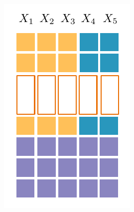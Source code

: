 \documentclass[final]{beamer}
\begin{document}
\begin{frame}{}
\begin{textblock}{25.7}
\begin{minipage}[t]{5.724cm}
    \includegraphics[width=\linewidth]{figures/grid-3}                                                           \end{minipage}
    

\end{textblock}
\end{frame}
\end{document}
